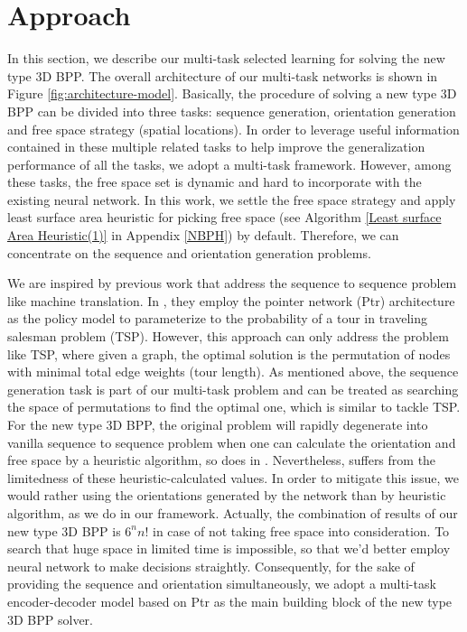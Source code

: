 \section{Approach}
\label{sec:model}
In this section, we describe our multi-task selected learning for solving the new type 3D BPP.
The overall architecture of our multi-task networks is shown in Figure \ref{fig:architecture-model}.
Basically, the procedure of solving a new type 3D BPP can be divided into three tasks: sequence generation, orientation generation and free space strategy (spatial locations). In order to leverage useful information contained in these multiple related tasks to help improve the generalization performance of all the tasks, we adopt a multi-task framework. However, among these tasks, the free space set is dynamic and hard to incorporate with the existing neural network. In this work, we settle the free space strategy and apply least surface area heuristic for picking free space (see Algorithm \ref{Least surface Area Heuristic(1)} in Appendix \ref{NBPH}) by default.  
Therefore, we can concentrate on the sequence and orientation generation problems.

We are inspired by previous work \cite{bello2016neural} that address the sequence to sequence problem like machine translation. In \cite{bello2016neural}, they employ the pointer network (Ptr) \cite{bahdanau2014neural} architecture as the policy model to parameterize to the probability of a tour in traveling salesman problem (TSP). However, this approach can only address the problem like TSP, where given a graph, the optimal solution is the permutation of nodes with minimal total edge weights (tour length). As mentioned above, the sequence generation task is part of our multi-task problem and can be treated as searching the space of permutations to find the optimal one, which is similar to tackle TSP. For the new type 3D BPP, the original problem will rapidly degenerate into vanilla sequence to sequence problem when one can calculate the orientation and free space by a heuristic algorithm, so does in \cite{Hu2017Solving}. Nevertheless, \cite{Hu2017Solving} suffers from the limitedness of these heuristic-calculated values. In order to mitigate this issue, we would rather using the orientations generated by the network than by heuristic algorithm, as we do in our framework. %
Actually, the combination of results of our new type 3D BPP is $6^{n}n!$ in case of not taking free space into consideration. To search that huge space in limited time is impossible, so that we'd better employ neural network to make decisions straightly.
Consequently, for the sake of providing the sequence and orientation simultaneously, we adopt a multi-task encoder-decoder model based on Ptr as the main building block of the new type 3D BPP solver.


